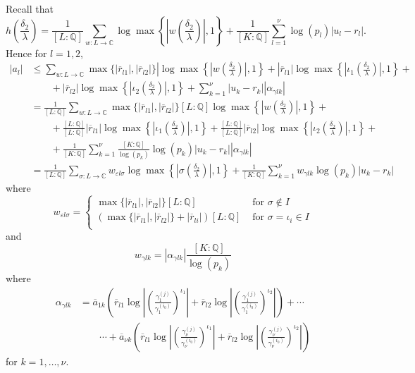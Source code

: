 Recall that
\[h\left(\frac{\delta_2}{\lambda}\right) = \frac{1}{[L:\mathbb{Q}]}\sum_{w :L \to \mathbb{C}} \log \max \left\{ \left|w\left(\frac{\delta_2}{\lambda}\right)\right|, 1\right\} + \frac{1}{[K:\mathbb{Q}]}\sum_{l = 1}^{\nu} \log(p_l)|u_l - r_l|.\]
Hence for $l = 1,2$, 
\begin{align*}
|a_l|	& \leq \sum_{w: L \to \mathbb{C}}\max\{|\overline{r}_{l1}|, |\overline{r}_{l2}|\}|\log\max\left\{\left|w\left(\frac{\delta_2}{\lambda}\right)\right|,1\right\} + |\overline{r}_{l1}|\log\max\left\{\left|\iota_1\left(\frac{\delta_2}{\lambda}\right)\right|,1\right\} + \\
	&\quad\quad + |\overline{r}_{l2}|\log\max\left\{\left|\iota_2\left(\frac{\delta_2}{\lambda}\right)\right|,1\right\}+ \sum_{k=1}^{\nu}|u_k-r_k||\alpha_{\gamma l k}|\\
	& = \frac{1}{[L:\mathbb{Q}]}\sum_{w: L \to \mathbb{C}}\max\{|\overline{r}_{l1}|, |\overline{r}_{l2}|\}[L:\mathbb{Q}]\log\max \left\{\left|w \left(\frac{\delta_2}{\lambda}\right)\right|,1\right\} +\\
	& \quad \quad + \frac{[L:\mathbb{Q}]}{[L:\mathbb{Q}]}|\overline{r}_{l1}|\log\max\left\{\left|\iota_1\left(\frac{\delta_2}{\lambda}\right)\right|,1\right\} + \frac{[L:\mathbb{Q}]}{[L:\mathbb{Q}]}|\overline{r}_{l2}|\log\max\left\{\left|\iota_2\left(\frac{\delta_2}{\lambda}\right)\right|,1\right\} + \\
	& \quad \quad + \frac{1}{[K:\mathbb{Q}]}\sum_{k=1}^{\nu}\frac{[K:\mathbb{Q}]}{\log(p_k)}\log(p_k)|u_k-r_k||\alpha_{\gamma l k}|\\
	& = \frac{1}{[L:\mathbb{Q}]}\sum_{\sigma :L \to \mathbb{C}} w_{\varepsilon l \sigma}\log \max \left\{ \left|\sigma\left(\frac{\delta_2}{\lambda}\right)\right|, 1\right\} + \frac{1}{[K:\mathbb{Q}]}\sum_{k = 1}^{\nu} w_{\gamma l k}\log(p_k)|u_k - r_k|
\end{align*}
where
\[w_{\varepsilon l \sigma} = 
\begin{cases}
\max\{|\overline{r}_{l1}|, |\overline{r}_{l2}|\}[L:\mathbb{Q}] & \text{ for } \sigma \notin I\\
\left(\max\{|\overline{r}_{l1}|, |\overline{r}_{l2}|\} + |\overline{r}_{li}|\right)[L:\mathbb{Q}] & \text{ for } \sigma = \iota_i \in I\\
\end{cases}\]
and 
\[w_{\gamma l k} = |\alpha_{\gamma l k}|\frac{[K:\mathbb{Q}]}{\log(p_k)}\]
where
\begin{align*}
\alpha_{\gamma l k} 
	& = \overline{a}_{1k} \left(\overline{r}_{l1} \log\left| \left( \frac{\gamma_1^{(j)}}{\gamma_1^{(i_0)}}\right)^{\iota_1}\right|+ \overline{r}_{l2}\log\left| \left( \frac{\gamma_1^{(j)}}{\gamma_1^{(i_0)}}\right)^{\iota_2}\right|\right) + \cdots \\
	& \quad \quad \cdots + \overline{a}_{\nu k} \left(\overline{r}_{l1} \log\left| \left( \frac{\gamma_{\nu}^{(j)}}{\gamma_{\nu}^{(i_0)}}\right)^{\iota_1}\right|+ \overline{r}_{l2}\log\left| \left( \frac{\gamma_{\nu}^{(j)}}{\gamma_{\nu}^{(i_0)}}\right)^{\iota_2}\right|\right)
\end{align*}
for $k = 1, \dots, \nu$.

